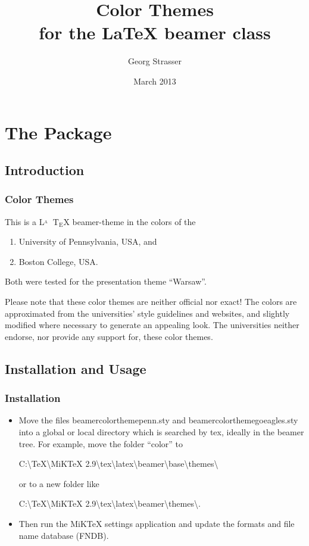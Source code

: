 \documentclass[dvips]{beamer}
\title[Color Themes]{Color Themes\\for the \LaTeX \xspace beamer class}
\author[Georg Strasser]{Georg Strasser}
\institute{Boston College}
\date{March 2013}
\begin{document}
\frame{\titlepage}


\section[Package]{The Package}
\frame{\sectionpage}

\subsection{Introduction}

\begin{frame}
\frametitle{Color Themes}
This is a $\mathrm{L\!\!^{{}_{\scriptstyle A}} \!\!\!\!\!\;\; T\!_{\displaystyle E} \! X}$ beamer-theme in the colors of the
\begin{enumerate}
\item University of Pennsylvania, USA, and 
\item Boston College, USA.
\end{enumerate}
Both were tested for the presentation theme ``Warsaw''.

\vspace{0.3cm}

Please note that these color themes are neither official nor exact! The colors are approximated from the universities' style guidelines and websites, and slightly modified where necessary to generate an appealing look. The universities neither endorse, nor provide any support for, these color themes. 
\end{frame}

\subsection{Installation and Usage}

\begin{frame}
\frametitle{Installation}
\begin{itemize}
\item Move the files beamercolorthemepenn.sty and beamercolorthemegoeagles.sty into a global or local directory which is searched by tex, ideally in the beamer tree.
For example, move the folder ``color'' to 

C:\textbackslash TeX\textbackslash MiKTeX 2.9\textbackslash tex\textbackslash latex\textbackslash beamer\textbackslash base\textbackslash themes\textbackslash 

or to a new folder like

C:\textbackslash TeX\textbackslash MiKTeX 2.9\textbackslash tex\textbackslash latex\textbackslash beamer\textbackslash themes\textbackslash.
\item Then run the MiKTeX settings application and update the formats and file name database (FNDB).
\end{itemize}
\end{frame}
\end{document}
